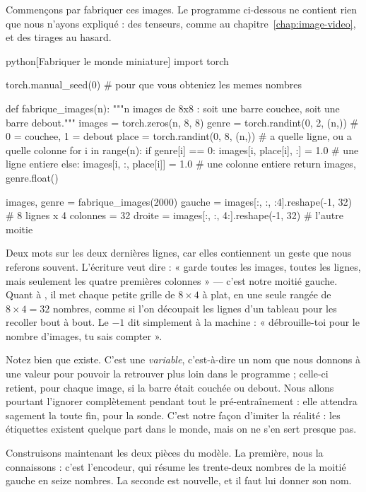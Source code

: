 Commençons par fabriquer ces images. Le programme ci-dessous ne contient rien
que nous n'ayons expliqué : des tenseurs, comme au
chapitre~\ref{chap:image-video}, et des tirages au hasard.

\begin{code}{python}[Fabriquer le monde miniature]
import torch

torch.manual_seed(0)          # pour que vous obteniez les memes nombres

def fabrique_images(n):
    """n images de 8x8 : soit une barre couchee, soit une barre debout."""
    images = torch.zeros(n, 8, 8)
    genre = torch.randint(0, 2, (n,))    # 0 = couchee, 1 = debout
    place = torch.randint(0, 8, (n,))    # a quelle ligne, ou a quelle colonne
    for i in range(n):
        if genre[i] == 0:
            images[i, place[i], :] = 1.0     # une ligne entiere
        else:
            images[i, :, place[i]] = 1.0     # une colonne entiere
    return images, genre.float()

images, genre = fabrique_images(2000)
gauche = images[:, :, :4].reshape(-1, 32)   # 8 lignes x 4 colonnes = 32
droite = images[:, :, 4:].reshape(-1, 32)   # l'autre moitie
\end{code}

Deux mots sur les deux dernières lignes, car elles contiennent un geste que
nous referons souvent. L'écriture  veut dire :
« garde toutes les images, toutes les lignes, mais seulement les quatre
premières colonnes » — c'est notre moitié gauche. Quant à
, il met chaque petite grille de $8 \times 4$ à
plat, en une seule rangée de $8 \times 4 = 32$ nombres, comme si l'on
découpait les lignes d'un tableau pour les recoller bout à bout. Le $-1$ dit
simplement à la machine : « débrouille-toi pour le nombre d'images, tu sais
compter ».

Notez bien que  existe. C'est une \emph{variable},
c'est-à-dire un nom que nous donnons à une valeur pour pouvoir la retrouver
plus loin dans le programme ; celle-ci retient, pour chaque image, si la
barre était couchée ou debout. Nous allons pourtant l'ignorer complètement
pendant tout le pré-entraînement : elle attendra sagement la toute fin, pour
la sonde. C'est notre façon d'imiter la réalité : les étiquettes existent
quelque part dans le monde, mais on ne s'en sert presque pas.

Construisons maintenant les deux pièces du modèle. La première, nous la
connaissons : c'est l'encodeur, qui résume les trente-deux nombres de la
moitié gauche en seize nombres. La seconde est nouvelle, et il faut lui
donner son nom.

